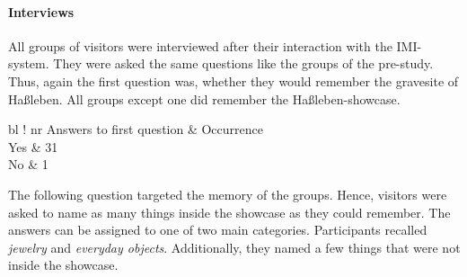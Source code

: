 
\paragraph{Interviews} All groups of visitors were interviewed after their interaction with the \ac{IMI}-system. They were asked the same questions like the groups of the pre-study. Thus, again the first question was, whether they would remember the gravesite of Haßleben. All groups except one did remember the Haßleben-showcase.
\begin{table}[H]
	\centering
	\begin{tabular}{ bl !{\vrule width 1pt} nr }
		\rowstyle{\bfseries}
		Answers	to first question	& Occurrence 	\\
		\toprule
		Yes												& 31					\\
		No												& 1						\\
	\end{tabular}
	\caption{Answers to the first question of the main study's interview.}
	\label{tab:main_study_question_1}  
\end{table}
The following question targeted the memory of the groups. Hence, visitors were asked to name as many things inside the showcase as they could remember. The answers can be assigned to one of two main categories. Participants recalled \textit{jewelry} and \textit{everyday objects}. Additionally, they named a few things that were not inside the showcase.
